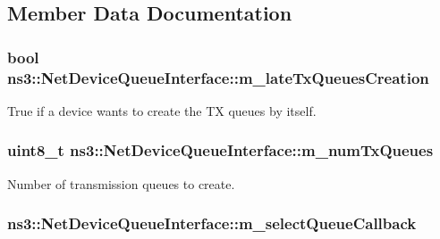 \subsection{Member Data Documentation}
\subsubsection[{\texorpdfstring{m\+\_\+late\+Tx\+Queues\+Creation}{m_lateTxQueuesCreation}}]{\setlength{\rightskip}{0pt plus 5cm}bool ns3\+::\+Net\+Device\+Queue\+Interface\+::m\+\_\+late\+Tx\+Queues\+Creation\hspace{0.3cm}{\ttfamily [private]}}\hypertarget{classns3_1_1NetDeviceQueueInterface_aa9d1c3e164f0e935a560218ff2603617}{}\label{classns3_1_1NetDeviceQueueInterface_aa9d1c3e164f0e935a560218ff2603617}


True if a device wants to create the TX queues by itself. 

\subsubsection[{\texorpdfstring{m\+\_\+num\+Tx\+Queues}{m_numTxQueues}}]{\setlength{\rightskip}{0pt plus 5cm}uint8\+\_\+t ns3\+::\+Net\+Device\+Queue\+Interface\+::m\+\_\+num\+Tx\+Queues\hspace{0.3cm}{\ttfamily [private]}}\hypertarget{classns3_1_1NetDeviceQueueInterface_ad5166ecee9c8d78c1dcfa053fbf95dbd}{}\label{classns3_1_1NetDeviceQueueInterface_ad5166ecee9c8d78c1dcfa053fbf95dbd}


Number of transmission queues to create. 

\subsubsection[{\texorpdfstring{m\+\_\+select\+Queue\+Callback}{m_selectQueueCallback}}]{ ns3\+::\+Net\+Device\+Queue\+Interface\+::m\+\_\+select\+Queue\+Callback\hspace{0.3cm}{\ttfamily [private]}}\hypertarget{classns3_1_1NetDeviceQueueInterface_a08223c1a87b5d3ddf3b9eaaf3b49d611}{}\label{classns3_1_1NetDeviceQueueInterface_a08223c1a87b5d3ddf3b9eaaf3b49d611}


